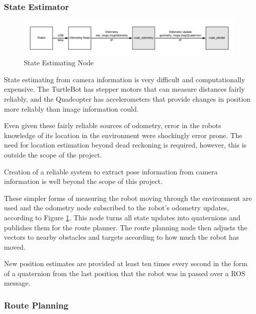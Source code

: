 \documentclass{article}[12]
\begin{document}
	\subsubsection{State Estimator}
	
	\begin{figure}[H]
		\centering
		\includegraphics[width=0.9\linewidth]{OdometryDigram.png}
		\caption{State Estimating Node}
		\label{fig:state}
	\end{figure}

	State estimating from camera information is very difficult and computationally expensive. The TurtleBot has stepper motors that can measure distances fairly reliably, and the Quadcopter has accelerometers that provide changes in position more reliably than image information could. 
	
	Even given these fairly reliable sources of odometry, error in the robots knowledge of its location in the environment were shockingly error prone. The need for location estimation beyond dead reckoning is required, however, this is outside the scope of the project.
	
	Creation of a reliable system to extract pose information from camera information is well beyond the scope of this project.
	
	These simpler forms of measuring the robot moving through the environment are used and the odometry node subscribed to the robot's odometry updates, according to Figure \ref{fig:state}. This node turns all state updates into quaternions and publishes them for the route planner. The route planning node then adjusts the vectors to nearby obstacles and targets according to how much the robot has moved. 
	
	New position estimates are provided at least ten times every second in the form of a quaternion from the last position that the robot was in passed over a ROS message.
	

	\subsubsection{Route Planning}
	
\end{document}
